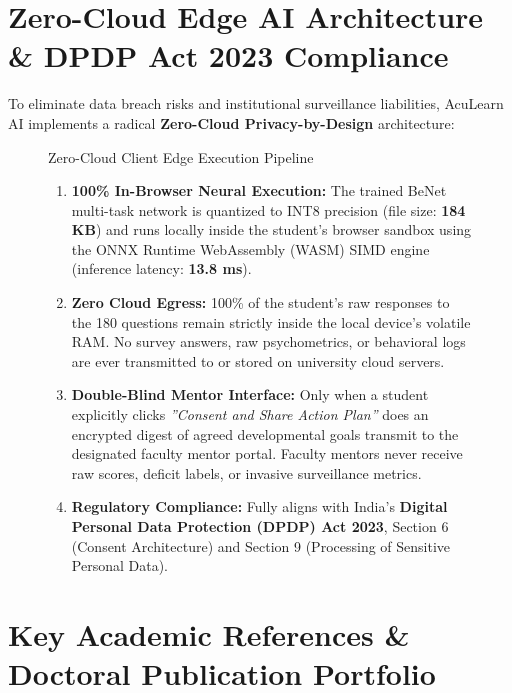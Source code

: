 \documentclass[10pt,a4paper]{article}
\begin{document}
\section{Zero-Cloud Edge AI Architecture \& DPDP Act 2023 Compliance}

To eliminate data breach risks and institutional surveillance liabilities, AcuLearn AI implements a radical \textbf{Zero-Cloud Privacy-by-Design} architecture:

\begin{figure}[h!]
\centering
\begin{summarybox}{Zero-Cloud Client Edge Execution Pipeline}
\begin{enumerate}[noitemsep, topsep=2pt]
  \item \textbf{100\% In-Browser Neural Execution:} The trained BeNet multi-task network is quantized to INT8 precision (file size: \textbf{184 KB}) and runs locally inside the student's browser sandbox using the ONNX Runtime WebAssembly (WASM) SIMD engine (inference latency: \textbf{13.8 ms}).
  \item \textbf{Zero Cloud Egress:} 100\% of the student's raw responses to the 180 questions remain strictly inside the local device's volatile RAM. No survey answers, raw psychometrics, or behavioral logs are ever transmitted to or stored on university cloud servers.
  \item \textbf{Double-Blind Mentor Interface:} Only when a student explicitly clicks \textit{''Consent and Share Action Plan''} does an encrypted digest of agreed developmental goals transmit to the designated faculty mentor portal. Faculty mentors never receive raw scores, deficit labels, or invasive surveillance metrics.
  \item \textbf{Regulatory Compliance:} Fully aligns with India's \textbf{Digital Personal Data Protection (DPDP) Act 2023}, Section 6 (Consent Architecture) and Section 9 (Processing of Sensitive Personal Data).
\end{enumerate}
\end{summarybox}
\end{figure}

\section{Key Academic References \& Doctoral Publication Portfolio}
\end{document}
